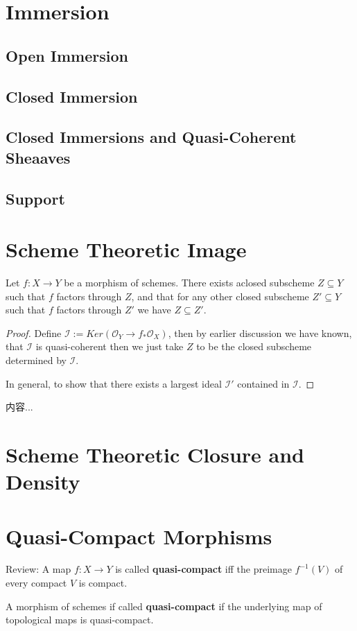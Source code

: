 \documentclass[Total.tex]{subfiles}
\begin{document}
		\section{Immersion}
			\subsection{Open Immersion}
			\subsection{Closed Immersion}
			\subsection{Closed Immersions and Quasi-Coherent Sheaaves}
			\subsection{Support}
		\section{Scheme Theoretic Image}
			\begin{lemma}
				Let $f:X\rightarrow Y$ be a morphism of schemes. There exists aclosed subscheme $Z\subseteq Y$ such that $f$ factors through $Z$, and that for any other closed subscheme $Z'\subseteq Y$ such that $f$ factors through $Z'$ we have $Z\subseteq Z'$.
			\end{lemma}
			\begin{proof}
				Define $\mathcal{I}:=Ker(\mathcal{O}_Y\rightarrow f_*\mathcal{O}_X)$, then by earlier discussion we have known, that $\mathcal{I}$ is quasi-coherent then we just take $Z$ to be the closed subscheme determined by $\mathcal{I}$.
				
				In general, to show that there exists a largest ideal $\mathcal{I}'$ contained in $\mathcal{I}$.
			\end{proof}
			
			\begin{Def}
				内容...
			\end{Def}
		\section{Scheme Theoretic Closure and Density}
		\section{Quasi-Compact Morphisms}
			Review: A map $f:X\rightarrow Y$ is called \textbf{quasi-compact} iff the preimage $f^{-1}(V)$ of every compact $V$ is compact.
			\begin{Def}
				A morphism of schemes if called \textbf{quasi-compact} if the underlying map of  topological maps is quasi-compact. 
			\end{Def}
			
\end{document}
